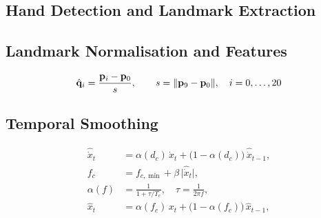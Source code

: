 \subsection{Hand Detection and Landmark Extraction}

\subsection{Landmark Normalisation and Features}
\begin{equation}
  \hat{\mathbf{q}}_i = \frac{\mathbf{p}_i - \mathbf{p}_0}{s}, \qquad
  s = \lVert \mathbf{p}_9 - \mathbf{p}_0 \rVert , \quad i = 0, \dots, 20
\end{equation}

\subsection{Temporal Smoothing}
\begin{align}
  \hat{\dot{x}}_t &= \alpha(d_c)\,\dot{x}_t + \bigl(1 - \alpha(d_c)\bigr)\,\hat{\dot{x}}_{t-1}, \\
  f_c &= f_{c,\min} + \beta\,\lvert \hat{\dot{x}}_t \rvert, \\
  \alpha(f) &= \frac{1}{1 + \tau / T_e}, \quad \tau = \frac{1}{2\pi f}, \\
  \hat{x}_t &= \alpha(f_c)\,x_t + \bigl(1 - \alpha(f_c)\bigr)\,\hat{x}_{t-1},
\end{align}

